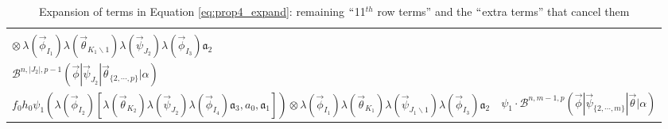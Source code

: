 \begin{landscape}
\begin{center}
\begin{table}
\begin{tabular}{ p{5.3in} | p{2.2in} }
    \breakcell{$f_0\theta_1( \lambda(\vec{\psi}_{J_1}) \lambda(\vec{\phi}_{I_2}) [
      \lambda(\vec{\theta}_{K_2}) \lambda(\vec{\psi}_{J_3}) \lambda(\vec{\phi}_{I_4})
      \mathfrak{a}_3, a_0, \mathfrak{a}_1]) \otimes$\\
      $\otimes\, \lambda(\vec{\phi}_{I_1}) \lambda(\vec{\theta}_{K_1 \backslash 1}) 
      \lambda(\vec{\psi}_{J_2}) \lambda(\vec{\phi}_{I_3}) \mathfrak{a}_2$} &
    \breakcell{$\theta_1 \{\vec{\psi}_{J_1}\} \cdot$\\
     $\mathcal{B}^{n, |J_2|, p-1}
     (\vec{\phi} | \vec{\psi}_{J_2} | \vec{\theta}_{\{2,\cdots,p\}} | \alpha)$} \\ \hline

    $f_0h_0\psi_1( \lambda(\vec{\phi}_{I_2}) [
      \lambda(\vec{\theta}_{K_2}) \lambda(\vec{\psi}_{J_2}) \lambda(\vec{\phi}_{I_4})
      \mathfrak{a}_3, a_0, \mathfrak{a}_1])
      \otimes \lambda(\vec{\phi}_{I_1}) \lambda(\vec{\theta}_{K_1}) 
      \lambda(\vec{\psi}_{J_1 \backslash 1}) \lambda(\vec{\phi}_{I_3}) \mathfrak{a}_2$ & 
    $\psi_1 \cdot
     \mathcal{B}^{n,m-1,p}
     (\vec{\phi} | \vec{\psi}_{\{2,\cdots,m\}} | \vec{\theta} | \alpha)$ \\ \hline

    \hline
  \end{tabular}
\caption{Expansion of terms in Equation \ref{eq:prop4_expand}: 
remaining $``$11$^{th}$ row terms'' and the $``$extra terms''
that cancel them}
\label{table:t42}
\end{table}  
\end{center}
\end{landscape}